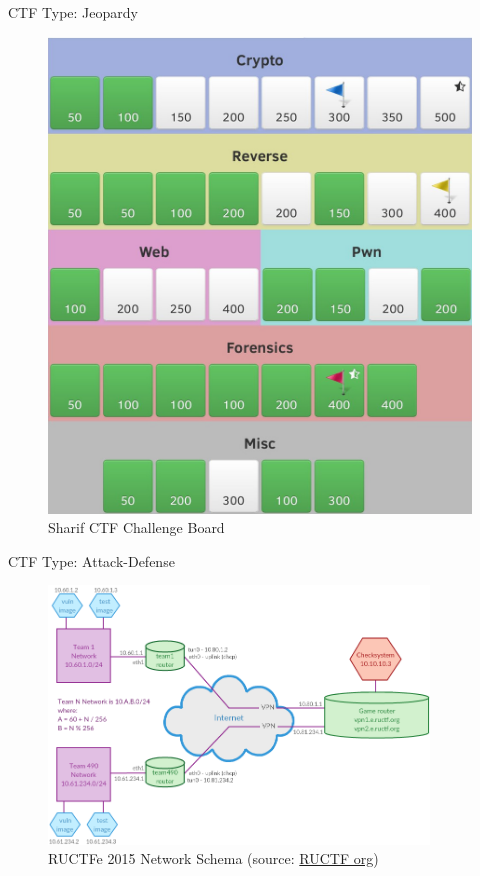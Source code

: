 \begin{frame}
  {CTF Type: Jeopardy}

  \begin{figure}[h]
    \centering
    \includegraphics[height=0.8\textheight]{../images/sharifctf-challenges.jpg}
    \caption{\footnotesize{}Sharif CTF Challenge Board}
    \label{fig:jeopardyboard}
  \end{figure}
\end{frame}

\begin{frame}
  {CTF Type: Attack-Defense}

  \begin{figure}[h]
    \centering
    \includegraphics[width=0.9\textwidth]{../images/ructf-network.png}
    \caption{\footnotesize
      RUCTFe 2015 Network Schema (source:
      \href{https://ructf.org/e/2015/network.html}{RUCTF org}) }
  \end{figure}
\end{frame}

